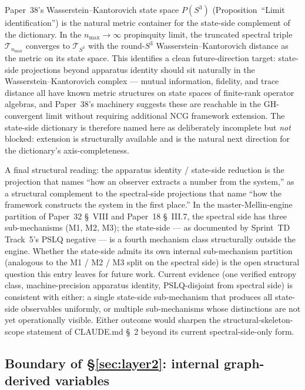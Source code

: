 \documentclass[11pt]{article}
\begin{document}
Paper~38's Wasserstein--Kantorovich state space $P(S^3)$
(Proposition~``Limit identification'') is the natural metric
container for the state-side complement of the dictionary.  In the
$n_{\max} \to \infty$ propinquity limit, the truncated spectral
triple $\mathcal{T}_{n_{\max}}$ converges to $\mathcal{T}_{S^3}$ with
the round-$S^3$ Wasserstein--Kantorovich distance as the metric on
its state space.  This identifies a clean future-direction target:
state-side projections beyond apparatus identity should sit naturally
in the Wasserstein--Kantorovich complex --- mutual information,
fidelity, and trace distance all have known metric structures on
state spaces of finite-rank operator algebras, and Paper~38's
machinery suggests these are reachable in the GH-convergent limit
without requiring additional NCG framework extension.  The state-side
dictionary is therefore named here as deliberately incomplete but
\emph{not} blocked: extension is structurally available and is the
natural next direction for the dictionary's axis-completeness.

A final structural reading: the apparatus identity / state-side
reduction is the projection that names ``how an observer extracts a
number from the system,'' as a structural complement to the
spectral-side projections that name ``how the framework constructs
the system in the first place.''  In the master-Mellin-engine
partition of Paper~32 \S~VIII and Paper~18 \S~III.7, the spectral
side has three sub-mechanisms (M1, M2, M3); the state-side --- as
documented by Sprint~TD Track~5's PSLQ negative --- is a fourth
mechanism class structurally outside the engine.  Whether the
state-side admits its own internal sub-mechanism partition
(analogous to the M1 / M2 / M3 split on the spectral side) is the
open structural question this entry leaves for future work.  Current
evidence (one verified entropy class, machine-precision apparatus
identity, PSLQ-disjoint from spectral side) is consistent with
either: a single state-side sub-mechanism that produces all
state-side observables uniformly, or multiple sub-mechanisms whose
distinctions are not yet operationally visible.  Either outcome would
sharpen the structural-skeleton-scope statement of CLAUDE.md \S~2
beyond its current spectral-side-only form.

\subsection{Boundary of \S\ref{sec:layer2}: internal graph-derived variables}
\label{sec:layer2_boundary}
\end{document}
